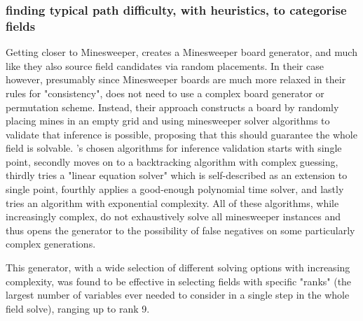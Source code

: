 \subsubsection{finding typical path difficulty, with heuristics, to categorise fields} \label{awa:fieldQuantisingWithHeuristics}
Getting closer to Minesweeper, \citet{minesweeperGeneration} creates a Minesweeper board generator, and much like \citet{sudokuComputationalModel} they also source field candidates via random placements. In their case however, presumably since Minesweeper boards are much more relaxed in their rules for "consistency", \citeauthor{minesweeperGeneration} does not need to use a complex board generator or permutation scheme. Instead, their approach constructs a board by randomly placing mines in an empty grid and using minesweeper solver algorithms to validate that inference is possible, proposing that this should guarantee the whole field is solvable.
\citeauthor{minesweeperGeneration}'s chosen algorithms for inference validation starts with single point, secondly moves on to a backtracking algorithm with complex guessing, thirdly tries a "linear equation solver" which is self-described as an extension to single point, fourthly applies a good-enough polynomial time solver, and lastly tries an algorithm with exponential complexity. All of these algorithms, while increasingly complex, do not exhaustively solve all minesweeper instances and thus opens the generator to the possibility of false negatives on some particularly complex generations.

This generator, with a wide selection of different solving options with increasing complexity, was found to be effective in selecting fields with specific "ranks" (the largest number of variables ever needed to consider in a single step in the whole field solve), ranging up to rank 9.

